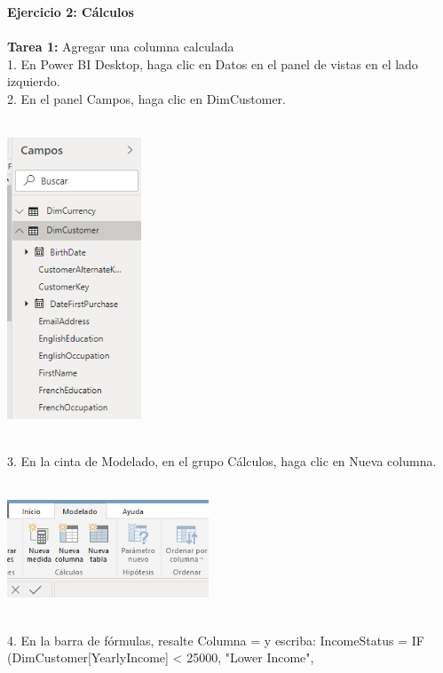 \begin{flushleft}
\begin{itemize}
\textbf{ }\\
\textbf{ }\\
\textbf{ }\\
\textbf{ }\\
\textbf{ }\\
\textbf{Ejercicio 2: Cálculos}\\
\textbf{ }\\
\textbf{Tarea 1:  } Agregar una columna calculada
\textbf{ }\\
1. En Power BI Desktop, haga clic en Datos en el panel de vistas en el lado izquierdo.\\
2. En el panel Campos, haga clic en DimCustomer.\\
\textbf{ }\\
\begin{center}
	\includegraphics[width=4cm]{./Imagenes/img30} 
	\end{center}
\textbf{ }\\
3. En la cinta de Modelado, en el grupo Cálculos, haga clic en Nueva columna.\\
\textbf{ }\\
\begin{center}
	\includegraphics[width=6cm]{./Imagenes/img31} 
	\end{center}
\textbf{ }\\
4. En la barra de fórmulas, resalte Columna = y escriba: 
IncomeStatus = IF (DimCustomer[YearlyIncome] < 25000, "Lower Income",

\end{itemize}
\end{flushleft}
